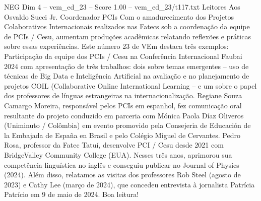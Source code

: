 \begin{textsample}{NEG Dim 4 – vem\_ed\_23 – Score 1.00 – vem\_ed\_23/t117.txt}  \label{ex:f4_neg_087}
Leitores Aos Osvaldo Succi Jr.
Coordenador PCIs Com o amadurecimento dos Projetos Colaborativos Internacionais realizados nas Fatecs sob a coordenação da equipe de PCIs / Cesu, aumentam produções acadêmicas relatando reflexões e práticas sobre essas experiências.
Este número 23 de VEm destaca três exemplos: Participação da equipe dos PCIs / Cesu na Conferência Internacional Faubai 2024 com apresentação de três trabalhos: dois sobre temas emergentes – uso de técnicas de Big Data e Inteligência Artificial na avaliação e no planejamento de projetos COIL (Collaborative Online International Learning – e um sobre o papel dos professores de línguas estrangeiras na internacionalização.
Regiane Souza Camargo Moreira, responsável pelos PCIs em espanhol, fez comunicação oral resultante do projeto conduzido em parceria com Mónica Paola Díaz Oliveros (Uniminuto / Colômbia) em evento promovido pela Consejeria de Educación de la Embajada de España en Brasil e pelo Colégio Miguel de Cervantes.
Pedro Rosa, professor da Fatec Tatuí, desenvolve PCI / Cesu desde 2021 com BridgeValley Community College (EUA).
Nesses três anos, aprimorou sua competência linguística no inglês e conseguiu publicar no Journal of Physics (2024).
Além disso, relatamos as visitas dos professores Rob Steel (agosto de 2023) e Cathy Lee (março de 2024), que concedeu entrevista à jornalista Patrícia Patrício em 9 de maio de 2024.
Boa leitura!

\end{textsample}
